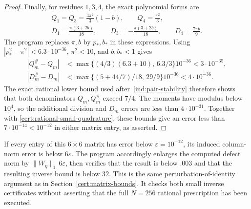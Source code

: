 \begin{proof}
Finally, for residues $1,3,4$, the exact polynomial forms are
\[
\begin{gathered}
 Q_1=Q_3=\frac{4\pi^2}{3}(1-b),\qquad Q_4=\frac{\pi^2}{3},\\
 D_1=\frac{\pi(3+2b)}{18},\qquad
 D_3=-\frac{\pi(3+2b)}{18},\qquad D_4=\frac{7\pi b}{9}.
\end{gathered}
\]
The program replaces $\pi,b$ by $p_*,b_*$ in these expressions.
Using $|p_*^2-\pi^2|<6.3\cdot10^{-36}$, $\pi^2<10$, and $b,b_*<1$ gives
\[
\begin{aligned}
 |Q_m^\#-Q_m|
 &<\max\{(4/3)(6.3+10),\,6.3/3\}10^{-36}<3\cdot10^{-35},\\
 |D_m^\#-D_m|
 &<\max\{(5+44/7)/18,\,29/9\}10^{-36}<4\cdot10^{-36}.
\end{aligned}
\]
The exact rational lower bound used
after~\eqref{ind:pair-stability} therefore shows that both denominators
$Q_m,Q_m^\#$ exceed $7/4$. The moments have modulus below $10^4$, so the
additional division and $D_m$ errors are less than $4\cdot10^{-31}$.
Together with \eqref{cert:rational-small-quadrature}, these bounds
give an error less than $7\cdot10^{-14}<10^{-12}$ in either matrix
entry, as asserted.
\end{proof}

If every entry of this $6\times6$ matrix has error below
$\varepsilon=10^{-12}$, its induced column-norm error is below
$6\varepsilon$. The program accordingly enlarges the computed
defect norm by $\|W_\eta\|_1\,6\varepsilon$, then verifies that the
result is below $.003$ and that the resulting inverse bound is below
$32$. This is the same perturbation-of-identity argument as in
Section~\ref{cert:matrix-bounds}. It checks both small inverse
certificates without asserting that the full $N=256$ rational
prescription has been executed.
